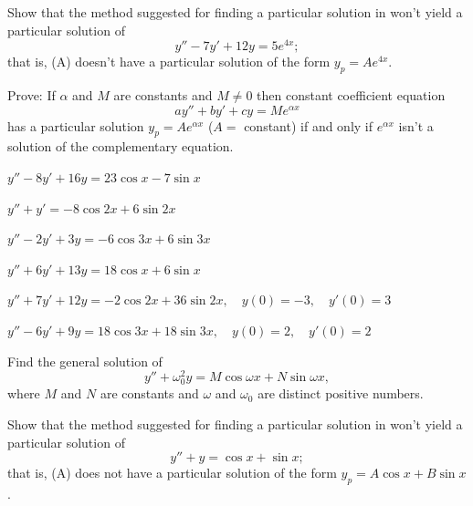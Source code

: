 \begin{exerciselist}

\item\label{exer:5.3.22}Show that the method suggested for finding a particular
solution in 
won't yield a particular solution of
\[
y''-7y'+12y=5e^{4x};
\tag{A}
\]
that is,  (A) doesn't have a particular solution
of the form $y_p=Ae^{4x}$.

\item\label{exer:5.3.23}Prove: If $\alpha$ and $M$ are constants and $M\ne0$  then
constant coefficient equation
\[
ay''+by'+cy=M e^{\alpha x}
\]
has a particular solution $y_p=Ae^{\alpha x}$ ($A=$ constant)
 if and only if $e^{\alpha x}$ isn't  a solution of the
complementary equation.


\item\label{exer:5.3.24}$y''-8y'+16y=23\cos x-7\sin x$

\item\label{exer:5.3.25}$y''+y'=-8\cos2x+6\sin2x$

 \item\label{exer:5.3.26}$y''-2y'+3y=-6\cos3x+6\sin3x$

 \item\label{exer:5.3.27}$y''+6y'+13y=18\cos x+6\sin x $

\item\label{exer:5.3.28}\CGex
 $y''+7y'+12y=-2\cos2x+36\sin2x, \quad  y(0)=-3,\quad y'(0)=3$

\item\label{exer:5.3.29}\CGex
$y''-6y'+9y=18\cos3x+18\sin3x, \quad  y(0)=2,\quad y'(0)=2$

\item\label{exer:5.3.30}Find the general solution of
\[
y''+\omega_0^2y =M\cos\omega x+N\sin\omega x,
\]
where $M$ and $N$ are constants and
 $\omega$ and $\omega_0$ are distinct  positive numbers.

\item\label{exer:5.3.31}Show that the method suggested for finding a particular
solution in 
won't yield a particular solution of
\[
y''+y=\cos x+\sin x;
\tag{A}
\]
that is,  (A) does not have a particular
solution of the form $y_p=A\cos x+B\sin x$.


\end{exerciselist}
